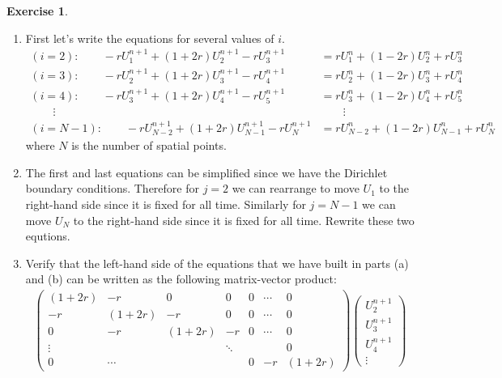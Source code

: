 \documentclass[
]{book}
\theoremstyle{definition}
\theoremstyle{definition}
\theoremstyle{definition}
\newtheorem{exercise}{Exercise}[chapter]
\theoremstyle{remark}
\begin{document}
\begin{exercise}
\begin{enumerate}
\def\labelenumi{\alph{enumi}.}
\item
  First let's write the equations for several values of \(i\).
  \[\begin{aligned}
                  (i=2): \qquad -r U_1^{n+1} + (1+2r) U^{n+1}_2 - rU^{n+1}_3 &= rU^n_1 +
                  (1-2r) U^n_2 + rU^n_3 \\
                  (i=3): \qquad -r U_2^{n+1} + (1+2r) U^{n+1}_3 - rU^{n+1}_4 &= rU^n_2 +
                  (1-2r) U^n_3 + rU^n_4 \\
                  (i=4): \qquad -r U_3^{n+1} + (1+2r) U^{n+1}_4 - rU^{n+1}_5 &= rU^n_3 +
                  (1-2r) U^n_4 + rU^n_5 \\
                  \qquad \vdots & \qquad \vdots \\
                  (i=N-1): \qquad -r U_{N-2}^{n+1} + (1+2r) U^{n+1}_{N-1} - rU^{n+1}_N &=
                  rU^n_{N-2} +
                  (1-2r) U^n_{N-1} + rU^n_{N} 
              \end{aligned}\] where \(N\) is the number of spatial
  points.
\item
  The first and last equations can be simplified since we have the
  Dirichlet boundary conditions. Therefore for \(j=2\) we can rearrange
  to move \(U_1\) to the right-hand side since it is fixed for all time.
  Similarly for \(j=N-1\) we can move \(U_N\) to the right-hand side since
  it is fixed for all time. Rewrite these two equtions.
\item
  Verify that the left-hand side of the equations that we have built
  in parts (a) and (b) can be written as the following matrix-vector
  product: \[\begin{aligned}
                  \begin{pmatrix}
                      (1+2r) & -r & 0 & 0 & 0 & \cdots & 0 \\
                      -r & (1+2r) & -r & 0 & 0 & \cdots & 0 \\
                      0 & -r & (1+2r) & -r & 0 & \cdots & 0 \\
                      \vdots & &  & \ddots &  & & 0 \\
                      0 & \cdots & & & 0 & -r & (1+2r)
                  \end{pmatrix} 
                  \begin{pmatrix} 
                      U^{n+1}_2 \\ U^{n+1}_3 \\ U^{n+1}_4 \\ \vdots

\end{pmatrix}
\end{aligned}\]
\end{enumerate}
\end{exercise}
\end{document}
